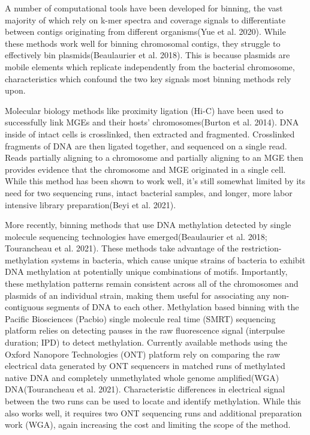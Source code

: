 A number of computational tools have been developed for binning, the vast majority of which rely on k-mer spectra and coverage signals to differentiate between contigs originating from different organisms(Yue et al. 2020). While these methods work well for binning chromosomal contigs, they struggle to effectively bin plasmids(Beaulaurier et al. 2018). This is because plasmids are mobile elements which replicate independently from the bacterial chromosome, characteristics which confound the two key signals most binning methods rely upon.

Molecular biology methods like proximity ligation (Hi-C) have been used to successfully link MGEs and their hosts’ chromosomes(Burton et al. 2014). DNA inside of intact cells is crosslinked, then extracted and fragmented. Crosslinked fragments of DNA are then ligated together, and sequenced on a single read. Reads partially aligning to a chromosome and partially aligning to an MGE then provides evidence that the chromosome and MGE originated in a single cell. While this method has been shown to work well, it’s still somewhat limited by its need for two sequencing runs, intact bacterial samples, and longer, more labor intensive library preparation(Beyi et al. 2021).

More recently, binning methods that use DNA methylation detected by single molecule sequencing technologies have emerged(Beaulaurier et al. 2018; Tourancheau et al. 2021). These methods take advantage of the restriction-methylation systems in bacteria, which cause unique strains of bacteria to exhibit DNA methylation at potentially unique combinations of motifs. Importantly, these methylation patterns remain consistent across all of the chromosomes and plasmids of an individual strain, making them useful for associating any non-contiguous segments of DNA to each other. Methylation based binning with the Pacific Biosciences (Pacbio) single molecule real time (SMRT) sequencing platform relies on detecting pauses in the raw fluorescence signal (interpulse duration; IPD) to detect methylation. Currently available methods using the Oxford Nanopore Technologies (ONT) platform rely on comparing the raw electrical data generated by ONT sequencers in matched runs of methylated native DNA and completely unmethylated whole genome amplified(WGA) DNA(Tourancheau et al. 2021). Characteristic differences in electrical signal between the two runs can be used to locate and identify methylation. While this also works well, it requires two ONT sequencing runs and additional preparation work (WGA), again increasing the cost and limiting the scope of the method.

